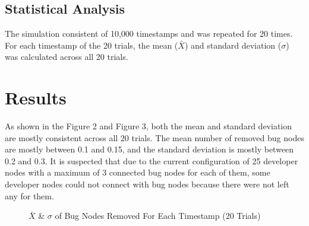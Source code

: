 \documentclass[10pt, a4paper, fleqn]{article}
\begin{document}
\subsection{Statistical Analysis}
The simulation consistent of 10,000 timestamps and was repeated for 20 times. For each timestamp of the 20 trials, the mean ($\bar{X}$) and standard deviation ($\sigma$) was calculated across all 20 trials.
\section{Results}
As shown in the Figure 2 and Figure 3, both the mean and standard deviation are mostly consistent across all 20 trials. The mean number of removed bug nodes are mostly between 0.1 and 0.15, and the standard deviation is mostly between 0.2 and 0.3.
\bigbreak
It is suspected that due to the current configuration of 25 developer nodes with a maximum of 3 connected bug nodes for each of them, some developer nodes could not connect with bug nodes because there were not left any for them.
\begin{figure}[hbt!]
	\centering
	\caption{$\bar{X}$ \& $\sigma$ of Bug Nodes Removed For Each Timestamp (20 Trials)}
\end{figure}
\end{document}
